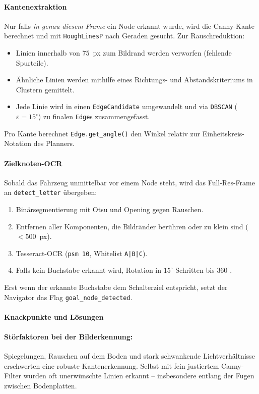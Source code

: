 \documentclass[main.tex]{subfiles} %
\begin{document}
\paragraph{Kantenextraktion}
Nur falls \emph{in genau diesem Frame} ein Node erkannt wurde, wird
die Canny-Kante berechnet und mit \texttt{HoughLinesP} nach Geraden
gesucht.
Zur Rauschreduktion:
\begin{itemize}
  \item Linien innerhalb von $75$~px zum Bildrand werden verworfen
    (fehlende Spurteile).
  \item Ähnliche Linien werden mithilfe
    eines Richtungs- und Abstandskriteriums in Clustern gemittelt.
  \item Jede Linie wird in einen \texttt{EdgeCandidate} umgewandelt
    und via \texttt{DBSCAN} ($\varepsilon=15^{\circ}$) zu
    finalen \texttt{Edge}s zusammengefasst.
\end{itemize}
Pro Kante berechnet \texttt{Edge.get\_angle()} den Winkel relativ zur
Einheitskreis-Notation des Planners.

\paragraph{Zielknoten-OCR}
Sobald das Fahrzeug unmittelbar vor einem Node steht, wird das
Full-Res-Frame an \texttt{detect\_letter} übergeben:
\begin{enumerate}
  \item Binärsegmentierung mit Otsu und Opening gegen Rauschen.
  \item Entfernen aller Komponenten, die Bildränder berühren oder
    zu klein sind ($<500$~px).
  \item Tesseract-OCR (\texttt{psm 10}, Whitelist \texttt{A|B|C}).
  \item Falls kein Buchstabe erkannt wird, Rotation in
    $15^{\circ}$-Schritten bis $360^{\circ}$.
\end{enumerate}
Erst wenn der erkannte Buchstabe dem
Schalterziel entspricht, setzt der Navigator das Flag
\texttt{goal\_node\_detected}.

\paragraph{Knackpunkte und Lösungen}

\paragraph{Störfaktoren bei der Bilderkennung:}  
Spiegelungen, Rauschen auf dem Boden und stark schwankende Lichtverhältnisse 
erschwerten eine robuste Kantenerkennung. Selbst mit fein justiertem Canny-Filter 
wurden oft unerwünschte Linien erkannt – insbesondere entlang der Fugen zwischen 
Bodenplatten.
\end{document}
